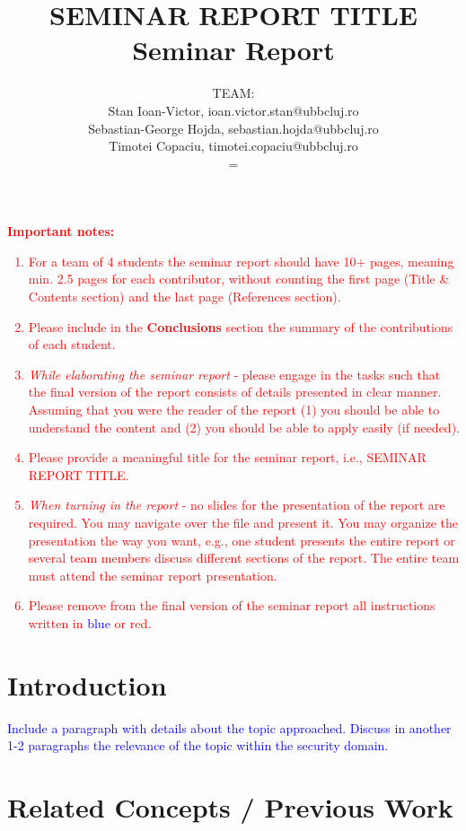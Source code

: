 \documentclass{article}
\title{\textbf{SEMINAR REPORT TITLE}\\
Seminar Report}
\author{TEAM:\\
Stan Ioan-Victor, ioan.victor.stan@ubbcluj.ro\\
Sebastian-George Hojda, sebastian.hojda@ubbcluj.ro\\
Timotei Copaciu, timotei.copaciu@ubbcluj.ro\\
=
}
\begin{document}
\maketitle

\textcolor{red}{\textbf{Important notes:}
\begin{enumerate}
    \item For a team of 4 students the seminar report should have 10+ pages, meaning min. 2.5 pages for each contributor, without counting the first page (Title \& Contents section) and the last page (References section).
    \item Please include in the \textbf{Conclusions} section the summary of the contributions of each student.
    \item \textit{While elaborating the seminar report} - please engage in the tasks such that the final version of the report consists of details presented in clear manner. Assuming that you were the reader of the report (1) you should be able to understand the content and (2) you should be able to apply easily (if needed).
    \item Please provide a meaningful title for the seminar report, i.e., SEMINAR REPORT TITLE.
    \item \textit{When turning in the report} - no slides for the presentation of the report are required. You may navigate over the file and present it. You may organize the presentation the way you want, e.g., one student presents the entire report or several team members discuss different sections of the report. The entire team must attend the seminar report presentation.
    \item Please remove from the final version of the seminar report all instructions written in \textcolor{blue}{blue} or \textcolor{red}{red}.
\end{enumerate}
}

\tableofcontents

\newpage

\section{Introduction}
\label{label:Introduction}

\textcolor{blue}{Include a paragraph with details about the topic approached. Discuss in another 1-2 paragraphs the relevance of the topic within the security domain.
}


\section{Related Concepts / Previous Work}
\label{label:RelatedConcepts}
\end{document}
